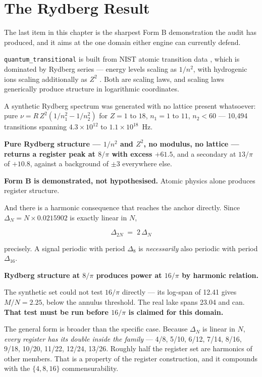 \documentclass[11pt, letterpaper, openany]{book}
\begin{document}
\section{The Rydberg Result}

The last item in this chapter is the sharpest Form B demonstration the audit has produced, and
it aims at the one domain either engine can currently defend.

\texttt{quantum\_transitional} is built from NIST atomic transition data \cite{nist_asd}, which
is dominated by Rydberg series --- energy levels scaling as $1/n^2$, with hydrogenic ions
scaling additionally as $Z^2$ \cite{rydberg1890, bohr1913}. Both are scaling laws, and scaling
laws generically produce structure in logarithmic coordinates.

A synthetic Rydberg spectrum was generated with no lattice present whatsoever: pure
$\nu = R\,Z^2\left(1/n_1^2 - 1/n_2^2\right)$ for $Z = 1$ to $18$, $n_1 = 1$ to $11$, $n_2 < 60$
--- 10{,}494 transitions spanning $4.3\times10^{12}$ to $1.1\times10^{18}$~Hz.

\begin{signalbox}
\textbf{Pure Rydberg structure --- $1/n^2$ and $Z^2$, no modulus, no lattice --- returns a
register peak at $8/\pi$ with excess $+61.5$}, and a secondary at $13/\pi$ of $+10.8$, against a
background of $\pm 3$ everywhere else.

\medskip
\noindent \textbf{Form B is demonstrated, not hypothesised.} Atomic physics alone produces
register structure.
\end{signalbox}

And there is a harmonic consequence that reaches the anchor directly. Since
$\Delta_N = N \times 0.0215902$ is exactly linear in $N$,

\[
\Delta_{2N} \;=\; 2\,\Delta_N
\]

precisely. A signal periodic with period $\Delta_8$ is \emph{necessarily} also periodic with
period $\Delta_{16}$.

\begin{warningbox}
\textbf{Rydberg structure at $8/\pi$ produces power at $16/\pi$ by harmonic relation.}

\medskip
\noindent The synthetic set could not test $16/\pi$ directly --- its log-span of 12.41 gives
$M/N = 2.25$, below the annulus threshold. The real lake spans 23.04 and can. \textbf{That test
must be run before $16/\pi$ is claimed for this domain.}

\medskip
\noindent The general form is broader than the specific case. Because $\Delta_N$ is linear in
$N$, \emph{every register has its double inside the family} --- 4/8, 5/10, 6/12, 7/14, 8/16,
9/18, 10/20, 11/22, 12/24, 13/26. Roughly half the register set are harmonics of other members.
That is a property of the register construction, and it compounds with the $\{4,8,16\}$
commensurability.
\end{warningbox}
\end{document}
